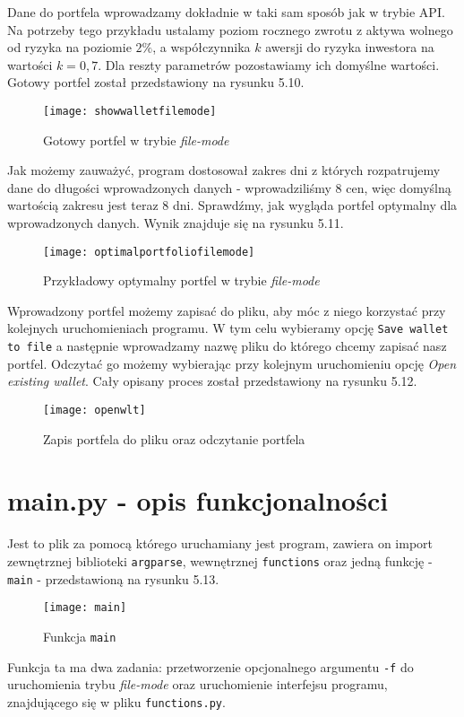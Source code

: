 \documentclass[magister]{dyplom}
\def\code#1{\texttt{#1}}
\begin{document}
\newpage
Dane do portfela wprowadzamy dokładnie w taki sam sposób jak w trybie API. Na potrzeby tego przykładu ustalamy poziom rocznego zwrotu z aktywa wolnego od ryzyka na poziomie $2 \%$, a współczynnika $k$ awersji do ryzyka inwestora na wartości $k=0,7$. Dla reszty parametrów pozostawiamy ich domyślne wartości. Gotowy portfel został przedstawiony na rysunku 5.10.

\begin{figure}[ht]
	\centering
	\texttt{[image: showwalletfilemode]}
	\caption{Gotowy portfel w trybie \textit{file-mode}}
\end{figure}
Jak możemy zauważyć, program dostosował zakres dni z których rozpatrujemy dane do długości wprowadzonych danych - wprowadziliśmy 8 cen, więc domyślną wartością zakresu jest teraz 8 dni.
Sprawdźmy, jak wygląda portfel optymalny dla wprowadzonych danych. Wynik znajduje się na rysunku 5.11.
\newpage
\begin{figure}[ht]
	\centering
	\texttt{[image: optimalportfoliofilemode]}
	\caption{Przykładowy optymalny portfel w trybie \textit{file-mode}}
\end{figure}

Wprowadzony portfel możemy zapisać do pliku, aby móc z niego korzystać przy kolejnych uruchomieniach programu. W tym celu wybieramy opcję \code{Save wallet to file} a następnie wprowadzamy nazwę pliku do którego chcemy zapisać nasz portfel. Odczytać go możemy wybierając przy kolejnym uruchomieniu opcję \textit{Open existing wallet}. Cały opisany proces został przedstawiony na rysunku 5.12.

\begin{figure}[h]
	\centering
	\texttt{[image: openwlt]}
	\caption{Zapis portfela do pliku oraz odczytanie portfela}
\end{figure}
\newpage
\section{main.py - opis funkcjonalności}
Jest to plik za pomocą którego uruchamiany jest program, zawiera on import zewnętrznej biblioteki \code{argparse}, wewnętrznej \code{functions} oraz jedną funkcję - \code{main} - przedstawioną na rysunku 5.13.

\begin{figure}[ht]
	\centering
	\texttt{[image: main]}
	\caption{Funkcja \code{main}}
\end{figure}

Funkcja ta ma dwa zadania: przetworzenie opcjonalnego argumentu \code{-f} do uruchomienia trybu \textit{file-mode} oraz uruchomienie interfejsu programu, znajdującego się w pliku \code{functions.py}.\\
\end{document}

